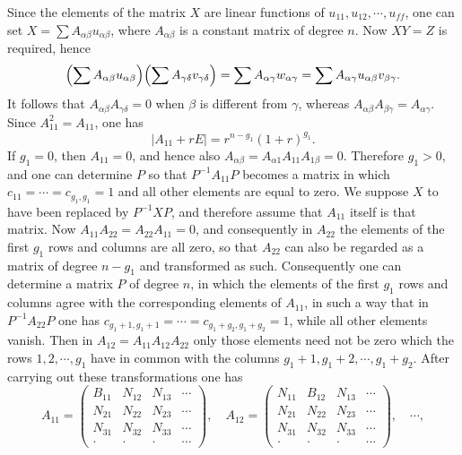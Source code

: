 \documentclass[11pt]{article}
\begin{document}
Since the elements of the matrix $X$ are linear functions of $u_{11},u_{12},\cdots,u_{ff}$, one can set $X=\sum A_{\alpha\beta}u_{\alpha\beta}$, where $A_{\alpha\beta}$ is a constant matrix of degree $n$. Now $XY=Z$ is required, hence
\[
\Bigl(\sum A_{\alpha\beta}u_{\alpha\beta}\Bigr)
\Bigl(\sum A_{\gamma\delta}v_{\gamma\delta}\Bigr)
 =\sum A_{\alpha\gamma}w_{\alpha\gamma}
 =\sum A_{\alpha\gamma}u_{\alpha\beta}v_{\beta\gamma}.
\]
It follows that $A_{\alpha\beta}A_{\gamma\delta}=0$ when $\beta$ is different from $\gamma$, whereas $A_{\alpha\beta}A_{\beta\gamma}=A_{\alpha\gamma}$. Since $A_{11}^2=A_{11}$, one has
\[
|A_{11}+rE|=r^{n-g_1}(1+r)^{g_1}.
\]
If $g_1=0$, then $A_{11}=0$, and hence also $A_{\alpha\beta}=A_{\alpha1}A_{11}A_{1\beta}=0$. Therefore $g_1>0$, and one can determine $P$ so that $P^{-1}A_{11}P$ becomes a matrix in which $c_{11}=\cdots=c_{g_1,g_1}=1$ and all other elements are equal to zero. We suppose $X$ to have been replaced by $P^{-1}XP$, and therefore assume that $A_{11}$ itself is that matrix. Now $A_{11}A_{22}=A_{22}A_{11}=0$, and consequently in $A_{22}$ the elements of the first $g_1$ rows and columns are all zero, so that $A_{22}$ can also be regarded as a matrix of degree $n-g_1$ and transformed as such. Consequently one can determine a matrix $P$ of degree $n$, in which the elements of the first $g_1$ rows and columns agree with the corresponding elements of $A_{11}$, in such a way that in $P^{-1}A_{22}P$ one has $c_{g_1+1,g_1+1}=\cdots=c_{g_1+g_2,g_1+g_2}=1$, while all other elements vanish. Then in $A_{12}=A_{11}A_{12}A_{22}$ only those elements need not be zero which the rows $1,2,\cdots,g_1$ have in common with the columns $g_1+1,g_1+2,\cdots,g_1+g_2$. After carrying out these transformations one has
\[
A_{11}=\begin{pmatrix}
B_{11}&N_{12}&N_{13}&\cdots\\
N_{21}&N_{22}&N_{23}&\cdots\\
N_{31}&N_{32}&N_{33}&\cdots\\
\cdot&\cdot&\cdot&\cdots
\end{pmatrix},\quad
A_{12}=\begin{pmatrix}
N_{11}&B_{12}&N_{13}&\cdots\\
N_{21}&N_{22}&N_{23}&\cdots\\
N_{31}&N_{32}&N_{33}&\cdots\\
\cdot&\cdot&\cdot&\cdots
\end{pmatrix},\quad\cdots,
\]
\end{document}
